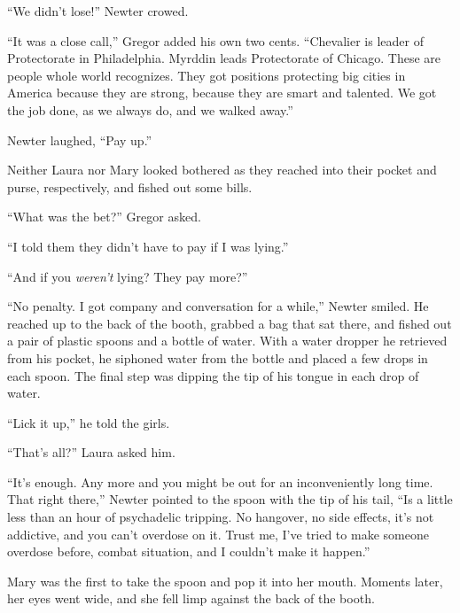 ``We didn't lose!'' Newter crowed.



``It was a close call,'' Gregor added his own two cents.  ``Chevalier is leader of Protectorate in Philadelphia.  Myrddin leads Protectorate of Chicago.  These are people whole world recognizes.  They got positions protecting big cities in America because they are strong, because they are smart and talented.  We got the job done, as we always do, and we walked away.''



Newter laughed, ``Pay up.''



Neither Laura nor Mary looked bothered as they reached into their pocket and purse, respectively, and fished out some bills.



``What was the bet?''  Gregor asked.



``I told them they didn't have to pay if I was lying.''



``And if you \emph{weren't} lying?  They pay more?''



``No penalty.  I got company and conversation for a while,'' Newter smiled.  He reached up to the back of the booth, grabbed a bag that sat there, and fished out a pair of plastic spoons and a bottle of water.  With a water dropper he retrieved from his pocket, he siphoned water from the bottle and placed a few drops in each spoon.  The final step was dipping the tip of his tongue in each drop of water.



``Lick it up,'' he told the girls.



``That's all?''  Laura asked him.



``It's enough.  Any more and you might be out for an inconveniently long time.  That right there,'' Newter pointed to the spoon with the tip of his tail, ``Is a little less than an hour of psychadelic tripping.  No hangover, no side effects, it's not addictive, and you can't overdose on it.  Trust me, I've tried to make someone overdose before, combat situation, and I couldn't make it happen.''



Mary was the first to take the spoon and pop it into her mouth.  Moments later, her eyes went wide, and she fell limp against the back of the booth.



